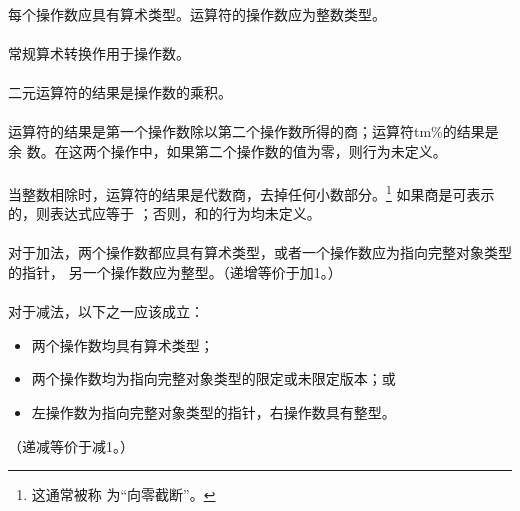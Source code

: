 {\constraint
\paragraph{}
每个操作数应具有算术类型。\tm{\%}运算符的操作数应为整数类型。

\semantic
\paragraph{}
常规算术转换作用于操作数。

\paragraph{}
二元\tm{*}运算符的结果是操作数的乘积。

\paragraph{}
运算符\tm{/}的结果是第一个操作数除以第二个操作数所得的商；运算符tm{\%}的结果是余
数。在这两个操作中，如果第二个操作数的值为零，则行为未定义。

\paragraph{}
当整数相除时，\tm{/}运算符的结果是代数商，去掉任何小数部分。\footnote{这通常被称
为``向零截断''。} 如果商是可表示的，则表达式应等于
；否则，和的行为均未定义。

\syntax
\paragraph{}

\constraint
\paragraph{}
对于加法，两个操作数都应具有算术类型，或者一个操作数应为指向完整对象类型的指针，
另一个操作数应为整型。（递增等价于加1。）

\paragraph{}
对于减法，以下之一应该成立：
\begin{itemize}
  \item{两个操作数均具有算术类型；}
  \item{两个操作数均为指向完整对象类型的限定或未限定版本；或}
  \item{左操作数为指向完整对象类型的指针，右操作数具有整型。}
\end{itemize}
（递减等价于减1。）

}
